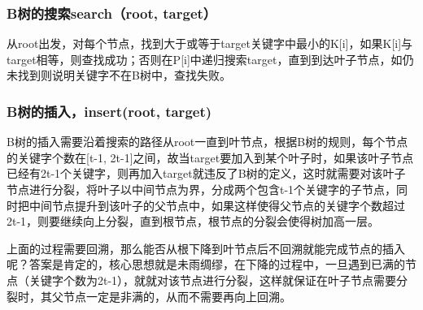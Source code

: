 \subsubsection{B树的搜索search（root, target）}
从root出发，对每个节点，找到大于或等于target关键字中最小的K[i]，如果K[i]与target相等，则查找成功；否则在P[i]中递归搜索target，直到到达叶子节点，如仍未找到则说明关键字不在B树中，查找失败。
 
\subsubsection{B树的插入，insert(root, target)}
B树的插入需要沿着搜索的路径从root一直到叶节点，根据B树的规则，每个节点的关键字个数在[t-1, 2t-1]之间，故当target要加入到某个叶子时，如果该叶子节点已经有2t-1个关键字，则再加入target就违反了B树的定义，这时就需要对该叶子节点进行分裂，将叶子以中间节点为界，分成两个包含t-1个关键字的子节点，同时把中间节点提升到该叶子的父节点中，如果这样使得父节点的关键字个数超过2t-1，则要继续向上分裂，直到根节点，根节点的分裂会使得树加高一层。
 
上面的过程需要回溯，那么能否从根下降到叶节点后不回溯就能完成节点的插入呢？答案是肯定的，核心思想就是未雨绸缪，在下降的过程中，一旦遇到已满的节点（关键字个数为2t-1），就就对该节点进行分裂，这样就保证在叶子节点需要分裂时，其父节点一定是非满的，从而不需要再向上回溯。
 
